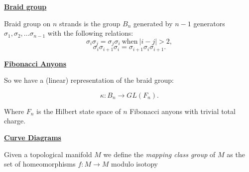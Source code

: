 \documentclass[12pt,a4paper]{article}
\begin{document}
\maketitle

\def\Complex {C}
\def\tensor{\otimes}
\def\Tensor{\bigotimes}
\def\bra #1{\langle #1|}
\def\ket #1{|#1\rangle}
\def\braket #1#2{\langle #1|#2 \rangle}



\def\mathZ{\mathbb{Z}}
\def\mathR{\mathbb{R}}


\def\heading #1{\vskip 20pt \noindent\underline{\bf #1}\vskip 5pt}


%

\heading{Braid group}

Braid group on $n$ strands is the group $B_n$ generated by $n-1$ generators
$\sigma_1, \sigma_2, ... \sigma_{n-1}$ with the following relations:
    $$ \sigma_i \sigma_j = \sigma_j \sigma_i \ \text{when}\ |i-j| > 2, $$
    $$ \sigma_i \sigma_{i+1} \sigma_i =  \sigma_{i+1} \sigma_i \sigma_{i+1}.$$



\heading{Fibonacci Anyons}


So we have a (linear) representation of the braid group:

    $$ \kappa : B_n \to GL(F_n).$$

Where $F_n$ is the Hilbert state space of $n$ Fibonacci anyons with
trivial total charge.



\heading{Curve Diagrams}


%

Given a topological manifold $M$ we define the {\it mapping class group} of $M$ as
the set of homeomorphisms $f:M\to M$ modulo isotopy
\end{document}
